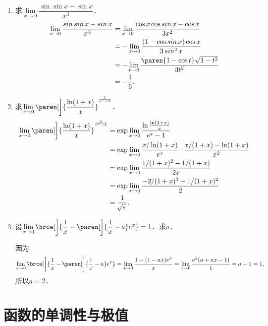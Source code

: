 \begin{enumerate}
\item 求\(\lim\limits_{x\to0} \dfrac{\sin\sin x - \sin x}{x^3}\)．
  \ifshowsol
  \begin{equation*}
    \begin{split}
      \lim_{x\to0} \frac{\sin\sin x - \sin x}{x^3}
      &= \lim_{x\to0} \frac{\cos x \cos\sin x - \cos x}{3x^2} \\
      &= - \lim_{x\to0} \frac{(1 - \cos\sin x) \cos x}{3\sin^2 x} \\
      &= - \lim_{t\to0} \frac{\paren{1 - \cos t} \sqrt{1-t^2}}{3t^2} \\
      &= - \frac16.
    \end{split}
  \end{equation*}
  \fi
  
\item 求\(\lim\limits_{x\to0} {}\paren[\bigg]{\dfrac{\ln(1+x)}{x}}^{\frac1{e^x-1}}\)．
  \ifshowsol
  \begin{equation*}
    \begin{split}
      \lim_{x\to0} \paren[\bigg]{\frac{\ln(1+x)}{x}}^{\frac1{e^x-1}}
      &= \exp \lim_{x\to0} \frac{\ln\frac{\ln(1+x)}{x}}{e^x-1} \\
      &= \exp \lim_{x\to0} \frac{x/\ln(1+x)}{e^x} \cdot \frac{x/(1+x)-\ln(1+x)}{x^2} \\
      &= \exp \lim_{x\to0} \frac{1/(1+x)^2 - 1/(1+x)}{2x} \\
      &= \exp \lim_{x\to0} \frac{-2/(1+x)^3 + 1/(1+x)^2}{2} \\
      &= \frac1{\!\sqrt e\,}.
    \end{split}
  \end{equation*}
  \fi
  
\item 设\(\lim\limits_{x\to0} {}\brce[\bigg]{\dfrac1x - \paren[\bigg]{\dfrac1x - a} e^x} = 1\)．求\(a\)．

  \ifshowsol
  因为
  \begin{equation*}
    \lim_{x\to0} {}\brce[\bigg]{\frac1x - \paren[\bigg]{\frac1x - a} e^x}
    = \lim_{x\to0} \frac{1-(1-ax)e^x}{x}
    =  \lim_{x\to0} \frac{e^x(a+ax-1)}{1}
    = a-1 = 1,
  \end{equation*}
  所以\(a = 2\)．
  \fi
\end{enumerate}
\fi

\section{函数的单调性与极值}

